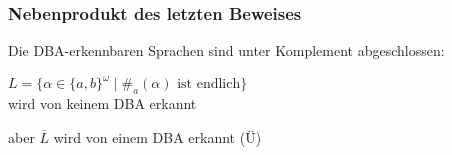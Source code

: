     \begin{frame}
      \frametitle{Nebenprodukt des letzten Beweises}
      
      Die DBA-erkennbaren Sprachen sind  unter Komplement abgeschlossen:
      \begin{Itemize}
        \item
          $L = \{\alpha \in \{a,b\}^\omega \mid \#_a(\alpha) \text{ ist endlich}\}$\\
          wird von keinem DBA erkannt
        \item
          aber $\overline L$ wird von einem DBA erkannt (Ü)
      \end{Itemize}

    \end{frame}


